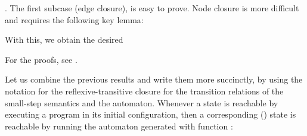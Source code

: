 \begin{isabellebody}
\begin{isamarkuptext}
. The first subcase (edge closure), is easy to prove. Node closure is  more difficult and requires the following key lemma:
\begin{lemma}\label{th:synt_step_image_all_locations}
\mbox{}\newline 
{}
\end{lemma}
With this, we obtain the desired
\begin{lemma}\label{th:synt_step_image_closed_stmt_to_ta}
\end{lemma}
For the proofs, see \cite{zipper_formalization}.\end{isamarkuptext}\isamarkuptrue \isadelimproof
\endisadelimproof
\isatagproof
\endisatagproof
{\isafoldproof}\isadelimproof
\endisadelimproof
\isadelimproof
\endisadelimproof
\isatagproof
\endisatagproof
{\isafoldproof}\isadelimproof
\endisadelimproof
\isadelimproof
\endisadelimproof
\isatagproof
\endisatagproof
{\isafoldproof}\isadelimproof
\endisadelimproof
\isadelimproof
\endisadelimproof
\isatagproof
\endisatagproof
{\isafoldproof}\isadelimproof
\endisadelimproof
\begin{isamarkuptext}Let us combine the previous results and write them
more succinctly, by using the notation \isa{{\isasymrightarrow}\isactrlsup {\isacharasterisk}} for the
reflexive-transitive closure for the transition relations of the small-step
semantics and the automaton. Whenever a state is reachable by executing a program 
in its initial configuration, then a corresponding (\isa{{\isasymapprox}}) state is reachable 
by running the automaton generated with function :


\end{isamarkuptext}
\end{isabellebody}
